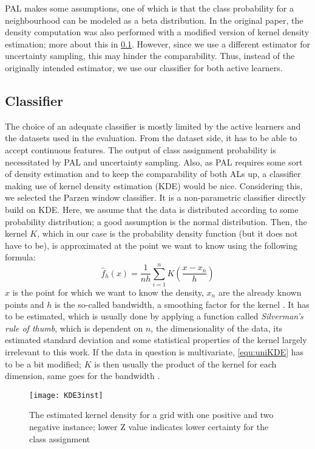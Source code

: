 PAL makes some assumptions, one of which is that the class probability for a neighbourhood can be modeled as a beta distribution. In the original paper, the density computation was also performed with a modified version of kernel density estimation; more about this in \ref{evaluation:classifier}. However, since we use a different estimator for uncertainty sampling, this may hinder the comparability. Thus, instead of the originally intended estimator, we use our classifier for both active learners.

\subsection{Classifier}
\label{evaluation:classifier}
The choice of an adequate classifier is mostly limited by the active learners and the datasets used in the evaluation. From the dataset side, it has to be able to accept continuous features. The output of class assignment probability is necessitated by PAL and uncertainty sampling. Also, as PAL requires some sort of density estimation and to keep the comparability of both ALs up, a classifier making use of kernel density estimation (KDE) would be nice. Considering this, we selected the Parzen window classifier. It is a non-parametric classifier directly build on KDE. Here, we assume that the data is distributed according to some probability distribution; a good assumption is the normal distribution. Then, the kernel $K$, which in our case is the probability density function (but it does not have to be), is approximated at the point we want to know using the following formula:
\begin{equation}
\label{equ:uniKDE}
\hat{f}_h(x) = \frac{1}{nh} \sum_{i=1}^{n} K(\frac{x-x_n}{h})
\end{equation}
$x$ is the point for which we want to know the density, $x_n$ are the already known points and $h$ is the so-called bandwidth, a smoothing factor for the kernel \cite{SheatherEtAl1991}. It has to be estimated, which is usually done by applying a function called \textit{Silverman's rule of thumb}, which is dependent on $n$, the dimensionality of the data, its estimated standard deviation and some statistical properties of the kernel largely irrelevant to this work. If the data in question is multivariate, \eqref{equ:uniKDE} has to be a bit modified; $K$ is then usually the product of the kernel for each dimension, same goes for the bandwidth \cite{Silverman1986}.

\begin{figure}[h]
	\centering
	\texttt{[image: KDE3inst]}
	\caption{The estimated kernel density for a grid with one positive and two negative instance; lower Z value indicates lower certainty for the class assignment}
	\label{fig:KDE3inst}
\end{figure}

